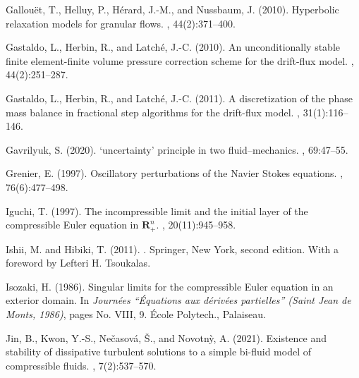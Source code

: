 \documentclass[11pt, twoside, a4paper]{article}
\theoremstyle{plain}
\theoremstyle{remark}
\numberwithin{equation}{section}
\begin{document}
\begin{thebibliography}{}
Gallou\"et, T., Helluy, P., H\'erard, J.-M., and Nussbaum, J. (2010).
\newblock Hyperbolic relaxation models for granular flows.
, 44(2):371--400.

Gastaldo, L., Herbin, R., and Latch\'e, J.-C. (2010).
\newblock An unconditionally stable finite element-finite volume pressure
  correction scheme for the drift-flux model.
, 44(2):251--287.

Gastaldo, L., Herbin, R., and Latch\'e, J.-C. (2011).
\newblock A discretization of the phase mass balance in fractional step
  algorithms for the drift-flux model.
, 31(1):116--146.

Gavrilyuk, S. (2020).
\newblock ‘uncertainty’ principle in two fluid--mechanics.
, 69:47--55.

Grenier, E. (1997).
\newblock Oscillatory perturbations of the {N}avier {S}tokes equations.
, 76(6):477--498.

Iguchi, T. (1997).
\newblock The incompressible limit and the initial layer of the compressible
  {E}uler equation in $\mathbf{R}_+^n$.
, 20(11):945--958.

Ishii, M. and Hibiki, T. (2011).
.
\newblock Springer, New York, second edition.
\newblock With a foreword by Lefteri H. Tsoukalas.

Isozaki, H. (1986).
\newblock Singular limits for the compressible {E}uler equation in an exterior
  domain.
\newblock In {\em Journ\'ees ``\'Equations aux d\'eriv\'ees partielles''
  ({S}aint {J}ean de {M}onts, 1986)}, pages No. VIII, 9. \'Ecole Polytech.,
  Palaiseau.

Jin, B., Kwon, Y.-S., Ne{\v{c}}asov{\'a}, {\v{S}}., and Novotn{\`y}, A. (2021).
\newblock Existence and stability of dissipative turbulent solutions to a
  simple bi-fluid model of compressible fluids.
, 7(2):537--570.


\end{thebibliography}
\end{document}
